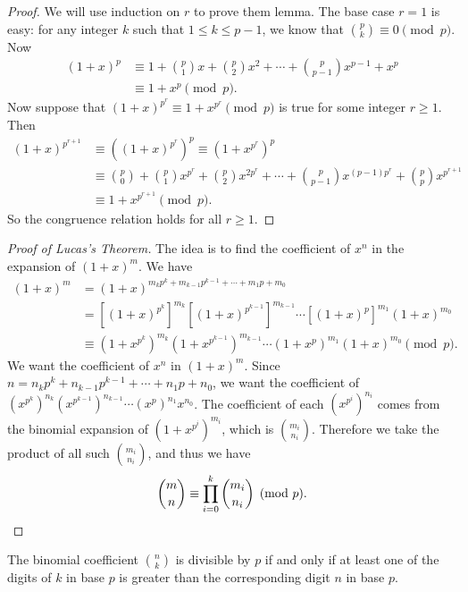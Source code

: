 \documentclass[12pt]{subfile}
\begin{document}
	\begin{proof}
		We will use induction on $r$ to prove them lemma. The base case $r=1$ is easy: for any integer $k$ such that $1 \leq k \leq p-1$, we know that $\binom{p}{k} \equiv 0 \pmod p$. Now
			\begin{align*}
				(1+x)^p&\equiv 1+\binom{p}{1}x+\binom{p}{2}x^2+\cdots+\binom{p}{p-1}x^{p-1}+x^p\\ &\equiv 1+x^p\pmod p.
			\end{align*}
		Now suppose that $(1+x)^{p^r}\equiv 1+x^{p^r}\pmod{p}$ is true for some integer $r \geq 1$. Then
			\begin{align*}
				(1+x)^{p^{r+1}} &\equiv\left((1+x)^{p^r}\right)^p \equiv\left(1+x^{p^r}\right)^p\\ &\equiv\binom{p}{0}+\binom{p}{1}x^{p^r}+\binom{p}{2}x^{2p^r}+\cdots+\binom{p}{p-1}x^{(p-1)p^r}+\binom{p}{p}x^{p^{r+1}}\\ &\equiv 1+x^{p^{r+1}}\pmod{p}.
			\end{align*}
		So the congruence relation holds for all $r \geq 1$.
	\end{proof}
	
	\begin{proof}[Proof of Lucas's Theorem]
		The idea is to find the coefficient of $x^n$ in the expansion of $(1+x)^m$. We have
			\begin{align*}
				(1+x)^m&=(1+x)^{m_kp^k+m_{k-1}p^{k-1}+\cdots+m_1p+m_0}\\ &=[(1+x)^{p^k}]^{m_k}[(1+x)^{p^{k-1}}]^{m_{k-1}}\cdots[(1+x)^p]^{m_1}(1+x)^{m_0}\\ &\equiv(1+x^{p^k})^{m_k}(1+x^{p^{k-1}})^{m_{k-1}}\cdots(1+x^p)^{m_1}(1+x)^{m_0}\pmod{p}.
			\end{align*}
		We want the coefficient of $x^n$ in $(1+x)^m$. Since $n=n_kp^k+n_{k-1}p^{k-1}+\cdots +n_1p+n_0$, we want the coefficient of $(x^{p^{k}})^{n_{k}}(x^{p^{k-1}})^{n_{k-1}}\cdots (x^p)^{n_1}x^{n_0}$.
		The coefficient of each $(x^{p^{i}})^{n_{i}}$ comes from the binomial expansion of $(1+x^{p^i})^{m_i}$, which is $\binom{m_i}{n_i}$. Therefore we take the product of all such $\binom{m_i}{n_i}$, and thus we have
		\begin{equation*}
		\binom{m}{n}\equiv\prod_{i=0}^{k}\binom{m_i}{n_i}\pmod{p}. \qedhere
		\end{equation*}		
	\end{proof}
	
	\begin{corollary}\label{cor:binomdiv}
		The binomial coefficient $\binom{n}{k}$ is divisible by $p$ if and only if at least one of the digits of $k$ in base $p$ is greater than the corresponding digit $n$ in base $p$.
	\end{corollary}
	
\end{document}
